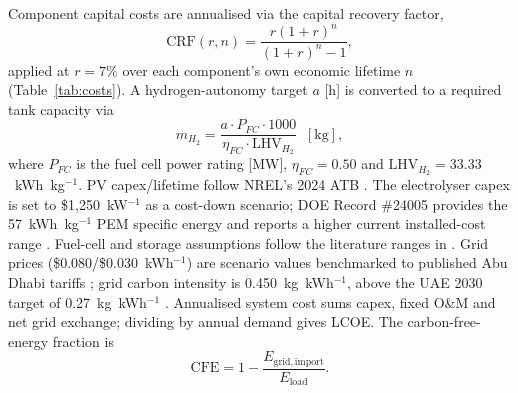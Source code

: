 \documentclass[conference]{IEEEtran}
\begin{document}
Component capital costs are annualised via the capital recovery factor,
\begin{equation}
\mathrm{CRF}(r,n) = \frac{r(1+r)^n}{(1+r)^n - 1},
\label{eq:crf}
\end{equation}
applied at $r=7\%$ over each component's own economic lifetime $n$ (Table~\ref{tab:costs}). A hydrogen-autonomy target $a$ [h] is converted to a required tank capacity via
\begin{equation}
m_{H_2} = \frac{a \cdot P_{FC}\cdot 1000}{\eta_{FC}\cdot\mathrm{LHV}_{H_2}}\;\;[\mathrm{kg}],
\label{eq:h2mass}
\end{equation}
where $P_{FC}$ is the fuel cell power rating [MW], $\eta_{FC}=0.50$ and $\mathrm{LHV}_{H_2}=33.33$~kWh~kg$^{-1}$. PV capex/lifetime follow NREL's 2024 ATB \cite{nrelatb2024}. The electrolyser capex is set to \$1{,}250~kW$^{-1}$ as a cost-down scenario; DOE Record \#24005 provides the 57~kWh~kg$^{-1}$ PEM specific energy and reports a higher current installed-cost range \cite{doe24005}. Fuel-cell and storage assumptions follow the literature ranges in \cite{kayacik2024}. Grid prices (\$0.080/\$0.030~kWh$^{-1}$) are scenario values benchmarked to published Abu Dhabi tariffs \cite{rsbtariffs}; grid carbon intensity is 0.450~kg~kWh$^{-1}$, above the UAE 2030 target of 0.27~kg~kWh$^{-1}$ \cite{uaees2050}. Annualised system cost sums capex, fixed O\&M and net grid exchange; dividing by annual demand gives LCOE. The carbon-free-energy fraction is
\begin{equation}
\mathrm{CFE} = 1 - \frac{E_{\mathrm{grid,import}}}{E_{\mathrm{load}}}.
\label{eq:cfe}
\end{equation}
\end{document}
